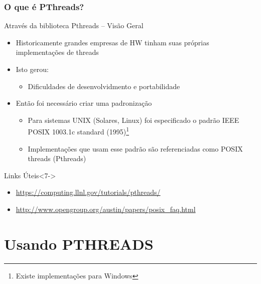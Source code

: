 \documentclass[10pt, xcolor=x11names]{beamer}
\begin{document}
\begin{frame} \frametitle{O que é PThreads?}
	\begin{block}{Através da biblioteca Pthreads -- Visão Geral}
		\begin{itemize}[<+->]
			\item Historicamente grandes empresas de HW tinham suas próprias implementações de threads
			\item Isto gerou:
				\begin{itemize}
					\item Dificuldades de desenvolvidmento e portabilidade
				\end{itemize}
			\item Então foi necessário criar uma padronização
				\begin{itemize}
					\item Para sistemas UNIX (Solares, Linux) foi especificado o padrão IEEE POSIX 1003.1c standard (1995)\footnote{Existe implementações para Windows}
					\item Implementações que usam esse padrão são referenciadas como POSIX threads (Pthreads)
				\end{itemize}
		\end{itemize}
	\end{block}

	\begin{block}{Links Úteis}<7->
		\begin{itemize}
			\item \url{https://computing.llnl.gov/tutorials/pthreads/}
			\item \url{http://www.opengroup.org/austin/papers/posix_faq.html}
			
		\end{itemize}
	\end{block}
\end{frame}

\section{Usando PTHREADS} 
\end{document}
